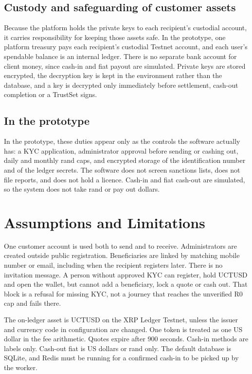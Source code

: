 \documentclass[11pt,a4paper]{article}
\begin{document}
\subsection{Custody and safeguarding of customer assets}
Because the platform holds the private keys to each recipient's custodial account, it carries responsibility for keeping those assets safe. In the prototype, one platform treasury pays each recipient's custodial Testnet account, and each user's spendable balance is an internal ledger. There is no separate bank account for client money, since cash-in and fiat payout are simulated. Private keys are stored encrypted, the decryption key is kept in the environment rather than the database, and a key is decrypted only immediately before settlement, cash-out completion or a TrustSet signs.

\subsection{In the prototype}
In the prototype, these duties appear only as the controls the software actually has: a KYC application, administrator approval before sending or cashing out, daily and monthly rand caps, and encrypted storage of the identification number and of the ledger secrets. The software does not screen sanctions lists, does not file reports, and does not hold a licence. Cash-in and fiat cash-out are simulated, so the system does not take rand or pay out dollars.

\section{Assumptions and Limitations}\label{sec:assumptions}

One customer account is used both to send and to receive. Administrators are created outside public registration. Beneficiaries are linked by matching mobile number or email, including when the recipient registers later. There is no invitation message. A person without approved KYC can register, hold UCTUSD and open the wallet, but cannot add a beneficiary, lock a quote or cash out. That block is a refusal for missing KYC, not a journey that reaches the unverified R0 cap and fails there.

The on-ledger asset is UCTUSD on the XRP Ledger Testnet, unless the issuer and currency code in configuration are changed. One token is treated as one US dollar in the fee arithmetic. Quotes expire after 900 seconds. Cash-in methods are labels only. Cash-out fiat is US dollars or rand only. The default database is SQLite, and Redis must be running for a confirmed cash-in to be picked up by the worker.
\end{document}
